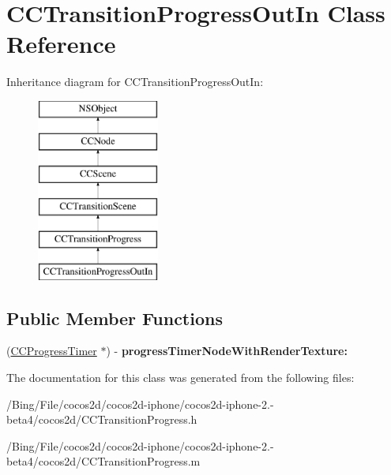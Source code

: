 \hypertarget{interface_c_c_transition_progress_out_in}{\section{C\-C\-Transition\-Progress\-Out\-In Class Reference}
\label{interface_c_c_transition_progress_out_in}
}
Inheritance diagram for C\-C\-Transition\-Progress\-Out\-In\-:\begin{figure}[H]
\begin{center}
\leavevmode
\includegraphics[height=6.000000cm]{interface_c_c_transition_progress_out_in}
\end{center}
\end{figure}
\subsection*{Public Member Functions}
\begin{DoxyCompactItemize}
\item 
\hypertarget{interface_c_c_transition_progress_out_in_a258e7a3d41ad4940d5dd19a8c0e8c381}{(\hyperlink{interface_c_c_progress_timer}{C\-C\-Progress\-Timer} $\ast$) -\/ {\bfseries progress\-Timer\-Node\-With\-Render\-Texture\-:}}\label{interface_c_c_transition_progress_out_in_a258e7a3d41ad4940d5dd19a8c0e8c381}

\end{DoxyCompactItemize}


The documentation for this class was generated from the following files\-:\begin{DoxyCompactItemize}
\item 
/\-Bing/\-File/cocos2d/cocos2d-\/iphone/cocos2d-\/iphone-\/2.-\/beta4/cocos2d/C\-C\-Transition\-Progress.\-h\item 
/\-Bing/\-File/cocos2d/cocos2d-\/iphone/cocos2d-\/iphone-\/2.-\/beta4/cocos2d/C\-C\-Transition\-Progress.\-m\end{DoxyCompactItemize}
